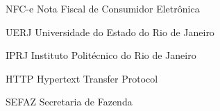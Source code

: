 \begin{siglas}
\item[NFC-e] Nota Fiscal de Consumidor Eletrônica
\item[UERJ] Universidade do Estado do Rio de Janeiro
\item[IPRJ] Instituto Politécnico do Rio de Janeiro
\item[HTTP] Hypertext Transfer Protocol
\item[SEFAZ] Secretaria de Fazenda
\end{siglas}